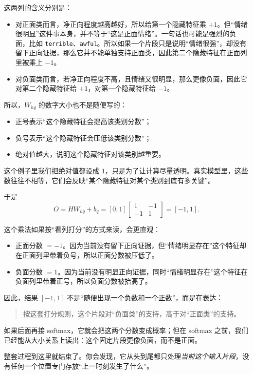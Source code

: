 \documentclass[12pt,a4paper]{ctexart}
\begin{document}
这两列的含义分别是：
\begin{itemize}
  \item 对正面类而言，净正向程度越高越好，所以给第一个隐藏特征乘 \(+1\)。但“情绪很明显”这件事本身，并不等于“这是正面情绪”。一句话也可能是强烈的负面，比如 \texttt{terrible}、\texttt{awful}。所以如果一个片段只是说明“情绪很强”，却没有留下正向证据，那么它并不能单独支持正面类，因此第二个隐藏特征在正面列里被乘上 \(-1\)。
  \item 对负面类而言，若净正向程度不高，且情绪又很明显，那么更像负面，因此它对第二个隐藏特征给 \(+1\)，对第一个隐藏特征给 \(-1\)。
\end{itemize}

所以，\(W_{hq}\) 的数字大小也不是随便写的：
\begin{itemize}
  \item 正号表示“这个隐藏特征会提高该类别分数”；
  \item 负号表示“这个隐藏特征会压低该类别分数”；
  \item 绝对值越大，说明这个隐藏特征对该类别越重要。
\end{itemize}

这个例子里我们把绝对值都设成 \(1\)，只是为了让计算尽量透明。真实模型里，这些数往往不相等，它们会反映“某个隐藏特征对某个类别到底有多关键”。

于是
\[
O = HW_{hq} + b_q
=
[0,1]
\begin{bmatrix}
1 & -1\\
-1 & 1
\end{bmatrix}
=
[-1,1].
\]

这个乘法如果按“看列打分”的方式来读，会更直观：
\begin{itemize}
  \item 正面分数 \(=-1\)。因为当前没有留下正向证据，但“情绪明显存在”这个特征却在正面列里带着负号，所以正面分数被压低了。
  \item 负面分数 \(=1\)。因为当前没有明显正向证据，同时“情绪明显存在”这个特征在负面列里带着正号，所以负面分数被抬高了。
\end{itemize}

因此，结果 \([-1,1]\) 不是“随便出现一个负数和一个正数”，而是在表达：
\begin{quote}
按这套打分规则，这个片段对“负面类”的支持，高于对“正面类”的支持。
\end{quote}

如果后面再接 softmax，它就会把这两个分数变成概率；但在 softmax 之前，我们已经能从大小关系上读出：这个固定片段更像负面，而不是正面。

整套过程到这里就结束了。你会发现，它从头到尾都只处理\emph{当前这个输入片段}，没有任何一个位置专门存放“上一时刻发生了什么”。
\end{document}
